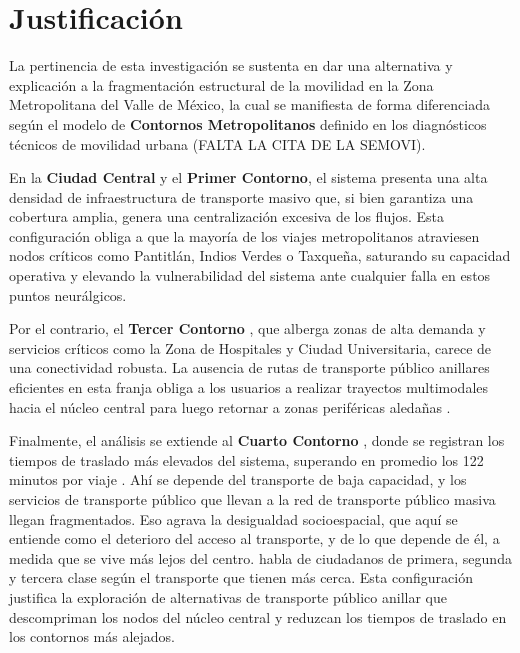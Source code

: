 
\section{Justificación}
\label{sec:justificacion}

La pertinencia de esta investigación se sustenta en dar una alternativa y
explicación a la fragmentación estructural de la movilidad en la Zona
Metropolitana del Valle de México, la cual se manifiesta de forma diferenciada
según el modelo de \textbf{Contornos Metropolitanos} definido en los
diagnósticos técnicos de movilidad urbana (FALTA LA CITA DE LA SEMOVI).

En la \textbf{Ciudad Central} y el \textbf{Primer Contorno}, el sistema presenta
una alta densidad de infraestructura de transporte masivo que, si bien garantiza
una cobertura amplia, genera una centralización excesiva de los flujos. Esta
configuración  obliga a que la mayoría de los viajes
metropolitanos atraviesen nodos críticos como Pantitlán, Indios Verdes o
Taxqueña, saturando su capacidad operativa y elevando la vulnerabilidad del
sistema ante cualquier falla en estos puntos neurálgicos.

Por el contrario, el \textbf{Tercer Contorno} , que
alberga zonas de alta demanda y servicios críticos como la Zona de Hospitales y
Ciudad Universitaria, carece de una conectividad  robusta. La
ausencia de rutas de transporte público anillares eficientes en 
esta franja obliga a los usuarios a
realizar trayectos multimodales hacia el núcleo central para luego retornar a
zonas periféricas aledañas .

Finalmente, el análisis se extiende al \textbf{Cuarto Contorno} , 
donde se registran los tiempos de traslado más elevados del sistema,
superando en promedio los 122 minutos por viaje \citep{semovi2020diagnostico}.
Ahí se depende del transporte de baja capacidad, y los servicios de transporte público
 que llevan a la red de transporte público masiva llegan fragmentados. 
 Eso agrava la desigualdad socioespacial, que
aquí se entiende como el deterioro del acceso al transporte, y de lo que depende
de él, a medida que se vive más lejos del centro. \citet{rendon2009ciudadanos}
habla de ciudadanos de primera, segunda y tercera clase según el transporte que
tienen más cerca. Esta configuración justifica la exploración de
alternativas de transporte público anillar
 que descompriman los nodos del núcleo central y
reduzcan los tiempos de traslado en los contornos más alejados.


